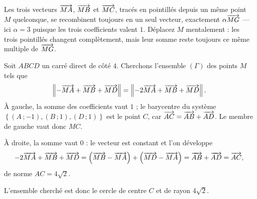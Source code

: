 \begin{visualisation}
\begin{center}
\end{center}
Les trois vecteurs $\overrightarrow{MA}$, $\overrightarrow{MB}$ et $\overrightarrow{MC}$, tracés en
pointillés depuis un même point $M$ quelconque, se recombinent toujours en un
seul vecteur, exactement $\alpha\overrightarrow{MG}$ — ici $\alpha = 3$ puisque les
trois coefficients valent $1$. Déplacez $M$ mentalement : les trois
pointillés changent complètement, mais leur somme reste toujours ce même
multiple de $\overrightarrow{MG}$.
\end{visualisation}

\begin{exemple}
Soit $ABCD$ un carré direct de côté $4$. Cherchons l'ensemble $(\Gamma)$ des
points $M$ tels que
\[
  \left\lVert -\overrightarrow{MA}+\overrightarrow{MB}+\overrightarrow{MD} \right\rVert
  = \left\lVert -2\overrightarrow{MA}+\overrightarrow{MB}+\overrightarrow{MD} \right\rVert .
\]
À gauche, la somme des coefficients vaut $1$ ; le barycentre du système
$\left\{(A\,;-1),(B\,;1),(D\,;1)\right\}$ est le point $C$, car
$\overrightarrow{AC} = \overrightarrow{AB}+\overrightarrow{AD}$. Le membre de gauche vaut donc $MC$.

À droite, la somme vaut $0$ : le vecteur est constant et l'on développe
\[
  -2\overrightarrow{MA}+\overrightarrow{MB}+\overrightarrow{MD}
  = \left(\overrightarrow{MB}-\overrightarrow{MA}\right)+\left(\overrightarrow{MD}-\overrightarrow{MA}\right)
  = \overrightarrow{AB}+\overrightarrow{AD} = \overrightarrow{AC},
\]
de norme $AC = 4\sqrt2$.

L'ensemble cherché est donc le cercle de centre $C$ et de rayon $4\sqrt2$.
\end{exemple}

